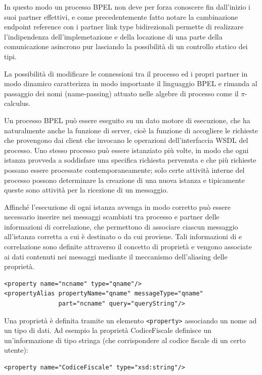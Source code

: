 In questo modo un processo BPEL non deve per forza conoscere
fin dall'inizio i suoi partner effettivi, e come precedentemente fatto notare
la cambinazione endpoint reference con i partner link type bidirezionali
permette di realizzare l'indipendenza dell'implemetazione e della locazione di
una parte della comunicazione asincrono pur lasciando la possibilità di un
controllo statico dei tipi.

La possibilità di modificare le connessioni tra il processo ed i propri partner
in modo dinamico caratterizza in modo importante il linguaggio BPEL 
e rimanda al passaggio dei nomi (name-passing)
attuato nelle algebre di processo come il $\pi$-calculus.

Un processo BPEL può essere eseguito su un dato motore di esecuzione, che
ha naturalmente anche la funzione di server, cioè la funzione di accogliere le
richieste che provengono dai client che invocano le operazioni dell'interfaccia
WSDL del processo. Uno stesso processo può essere istanziato più volte, in
modo che ogni istanza provveda a soddisfare una specifica richiesta pervenuta
e che più richieste possano essere processate contemporaneamente; solo certe
attività interne del processo possono determinare la creazione di una nuova
istanza e tipicamente queste sono attività per la ricezione di un messaggio.

Affinché l'esecuzione di ogni istanza avvenga in modo corretto può essere 
necessario inserire nei messaggi scambiati tra processo e partner delle
informazioni di correlazione, che permettono di associare ciascun messaggio 
all'istanza corretta a cui è destinato o da cui proviene. Tali informazioni di
e correlazione sono definite attraverso il concetto di proprietà e vengono
associate ai dati contenuti nei messaggi mediante il meccanismo dell'aliasing
delle proprietà. 

\begin{verbatim}
<property name="ncname" type="qname"/>
<propertyAlias propertyName="qname" messageType="qname"
               part="ncname" query="queryString"/>

\end{verbatim}

Una proprietà è definita tramite un elemento \texttt{<property>} associando un
nome ad un tipo di dati. Ad esempio la proprietà CodiceFiscale definisce
un un'informazione di tipo stringa (che corrispondere al codice fiscale di un
certo utente):

\begin{verbatim}
<property name="CodiceFiscale" type="xsd:string"/>
\end{verbatim}

